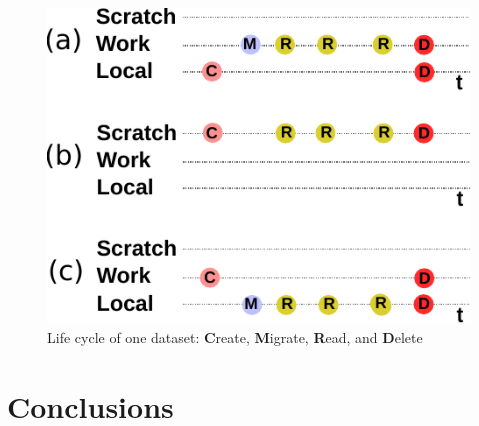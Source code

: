 \documentclass[a4paper]{article}
\begin{document}
{{{{\begin{figure}[H]
  \centering
  \includegraphics[width=0.6\columnwidth]{lifecycle}
  \caption{Life cycle of one dataset: \textbf{C}reate, \textbf{M}igrate, \textbf{R}ead, and \textbf{D}elete}
  \label{fig:lifecycle}
\end{figure}

}}

\section{Conclusions}
\label{sec:conclusions}



}}
\end{document}
